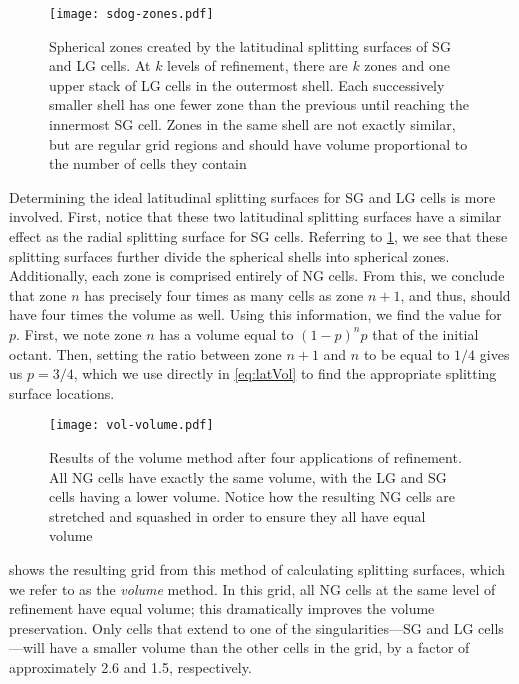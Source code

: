 \begin{figure}[ht!]
	\centering
	\texttt{[image: sdog-zones.pdf]}
	\caption[Spherical zones that result from SDOG refinement]{
		Spherical zones created by the latitudinal splitting surfaces of SG and LG cells.
		At $k$ levels of refinement, there are $k$ zones and one upper stack of LG cells in the outermost shell.
		Each successively smaller shell has one fewer zone than the previous until reaching the innermost SG cell.
		Zones in the same shell are not exactly similar, but are regular grid regions and should have volume proportional to the number of cells they contain
	}
	\label{fig:sdog-zones}
\end{figure}


Determining the ideal latitudinal splitting surfaces for SG and LG cells is more involved.
First, notice that these two latitudinal splitting surfaces have a similar effect as the radial splitting surface for SG cells.
Referring to \cref{fig:sdog-zones}, we see that these splitting surfaces further divide the spherical shells into spherical zones.
Additionally, each zone is comprised entirely of NG cells.
From this, we conclude that zone $n$ has precisely four times as many cells as zone $n+1$, and thus, should have four times the volume as well.
Using this information, we find the value for $p$.
First, we note zone $n$ has a volume equal to $\left( 1 - p \right)^{n} p$ that of the initial octant.
Then, setting the ratio between zone $n+1$ and $n$ to be equal to $1/4$ gives us $p = 3/4$, which we use directly in \cref{eq:latVol} to find the appropriate splitting surface locations.


\begin{figure}[ht!]
	\centering
	\texttt{[image: vol-volume.pdf]}
	\caption[Visualization of cell volumes in the volume modification]{
		Results of the volume method after four applications of refinement.
		All NG cells have exactly the same volume, with the LG and SG cells having a lower volume.
		Notice how the resulting NG cells are stretched and squashed in order to ensure they all have equal volume
	}
	\label{fig:modified-volume}
\end{figure}


 shows the resulting grid from this method of calculating splitting surfaces, which we refer to as the \textit{volume} method.
In this grid, all NG cells at the same level of refinement have equal volume; this dramatically improves the volume preservation.
Only cells that extend to one of the singularities---SG and LG cells---will have a smaller volume than the other cells in the grid, by a factor of approximately 2.6 and 1.5, respectively.


